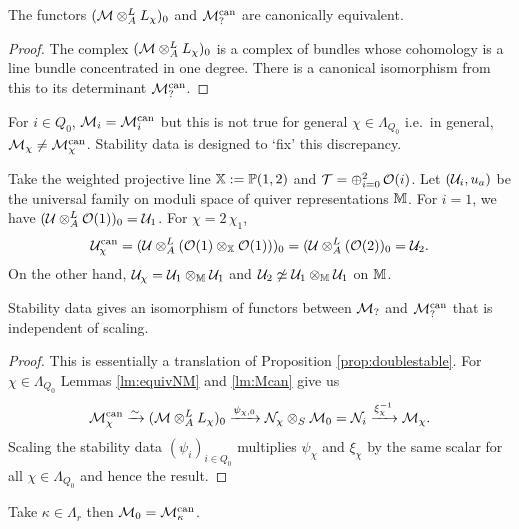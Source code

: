 \documentclass[12pt]{amsart}
\begin{document}
\begin{lemma}\label{lm:Mcan}
The functors $(\mathcal{M} \otimes_A^L L_\chi)_0$ and $\mathcal{M}_?^{\textup{can}}$ are canonically equivalent.
\end{lemma}

\begin{proof}
The complex $(\mathcal{M} \otimes_A^L L_\chi)_0$ is a complex of bundles whose cohomology is a line bundle concentrated in one degree. 
There is a canonical isomorphism from this to its determinant $\mathcal{M}_?^{\text{can}}$.
\end{proof}

For $i \in Q_0$, $\mathcal{M}_i= \mathcal{M}_i^\text{can}$ but this is not true for general $\chi \in \Lambda_{Q_0}$ i.e.\ in general, $\mathcal{M}_\chi \neq \mathcal{M}_\chi^\text{can}$.
Stability data is designed to `fix' this discrepancy.

\begin{example}
Take the weighted projective line $\mathbb{X}:=\mathbb{P}(1,2)$ and $\mathcal{T}= \oplus_{i=0}^2 \,\mathcal{O}(i)$.
Let $(\mathcal{U}_i, u_a)$ be the universal family on moduli space of quiver representations $\mathbb{M}$.
For $i=1$, we have $(\mathcal{U} \otimes_A^L \mathcal{O}(1))_0 = \mathcal{U}_1$.
For $\chi= 2\,\chi_1$, $$\mathcal{U}_\chi^\text{can} = (\mathcal{U} \otimes_A^L (\mathcal{O}(1)\otimes_{\mathbb{X}} \mathcal{O}(1)))_0 = (\mathcal{U} \otimes_A^L (\mathcal{O}(2))_0 = \mathcal{U}_2.$$
On the other hand, $\mathcal{U}_\chi = \mathcal{U}_1 \otimes_{\mathbb{M}} \mathcal{U}_1$ and $\mathcal{U}_2 \not\simeq \mathcal{U}_1 \otimes_{\mathbb{M}} \mathcal{U}_1$ on $\mathbb{M}$.
\end{example}

\begin{proposition}\label{prop:can}
Stability data gives an isomorphism of functors between $\mathcal{M}_?$ and $\mathcal{M}_?^{\textup{can}}$ that is independent of scaling. 
\end{proposition}

\begin{proof}
This is essentially a translation of Proposition \ref{prop:doublestable}.
For $\chi \in \Lambda_{Q_0}$ Lemmas \ref{lm:equivNM} and \ref{lm:Mcan} give us
$$\mathcal{M}_\chi^\text{can} \xrightarrow{\sim} (\mathcal{M} \otimes_A^L L_\chi)_0 \xrightarrow{\psi_{\chi,0}} \mathcal{N}_\chi \otimes_S \mathcal{M}_0 = \mathcal{N}_i \xrightarrow{{\xi_\chi^{-1}}} \mathcal{M}_\chi.$$
Scaling the stability data $(\psi_i)_{i\in Q_0}$ multiplies $\psi_\chi$ and $\xi_\chi$ by the same scalar for all $\chi \in \Lambda_{Q_0}$ and hence the result.
\end{proof}

\begin{lemma}\label{lm:kappa0}
Take $\kappa \in \Lambda_r$ then $\mathcal{M}_0 = \mathcal{M}_\kappa^\textup{can}$.
\end{lemma}
\end{document}
